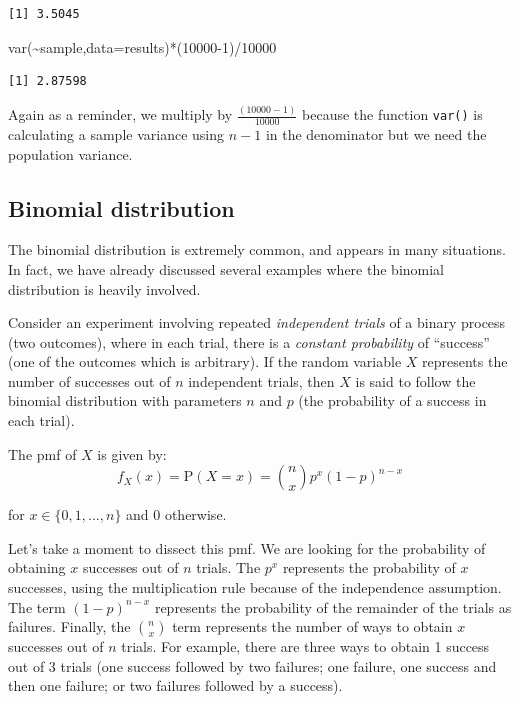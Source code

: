 \documentclass[
  letterpaper,
  DIV=11,
  numbers=noendperiod]{scrreprt}
\newenvironment{Shaded}{\begin{snugshade}}{\end{snugshade}}
\newcommand{\AttributeTok}[1]{\textcolor[rgb]{0.40,0.45,0.13}{#1}}
\newcommand{\DecValTok}[1]{\textcolor[rgb]{0.68,0.00,0.00}{#1}}
\newcommand{\FunctionTok}[1]{\textcolor[rgb]{0.28,0.35,0.67}{#1}}
\newcommand{\NormalTok}[1]{\textcolor[rgb]{0.00,0.23,0.31}{#1}}
\newcommand{\SpecialCharTok}[1]{\textcolor[rgb]{0.37,0.37,0.37}{#1}}
\begin{document}
\begin{verbatim}
[1] 3.5045
\end{verbatim}

\begin{Shaded}
\begin{Highlighting}[]
\FunctionTok{var}\NormalTok{(}\SpecialCharTok{\textasciitilde{}}\NormalTok{sample,}\AttributeTok{data=}\NormalTok{results)}\SpecialCharTok{*}\NormalTok{(}\DecValTok{10000{-}1}\NormalTok{)}\SpecialCharTok{/}\DecValTok{10000}
\end{Highlighting}
\end{Shaded}

\begin{verbatim}
[1] 2.87598
\end{verbatim}

Again as a reminder, we multiply by \(\frac{(10000-1)}{10000}\) because
the function \texttt{var()} is calculating a sample variance using
\(n-1\) in the denominator but we need the population variance.

\subsection{Binomial distribution}\label{binomial-distribution}

The binomial distribution is extremely common, and appears in many
situations. In fact, we have already discussed several examples where
the binomial distribution is heavily involved.

Consider an experiment involving repeated \emph{independent trials} of a
binary process (two outcomes), where in each trial, there is a
\emph{constant probability} of ``success'' (one of the outcomes which is
arbitrary). If the random variable \(X\) represents the number of
successes out of \(n\) independent trials, then \(X\) is said to follow
the binomial distribution with parameters \(n\) and \(p\) (the
probability of a success in each trial).

The pmf of \(X\) is given by: \[
f_X(x)=\mbox{P}(X=x)={n\choose{x}}p^x(1-p)^{n-x}
\]

for \(x \in \{0,1,...,n\}\) and 0 otherwise.

Let's take a moment to dissect this pmf. We are looking for the
probability of obtaining \(x\) successes out of \(n\) trials. The
\(p^x\) represents the probability of \(x\) successes, using the
multiplication rule because of the independence assumption. The term
\((1-p)^{n-x}\) represents the probability of the remainder of the
trials as failures. Finally, the \(n\choose x\) term represents the
number of ways to obtain \(x\) successes out of \(n\) trials. For
example, there are three ways to obtain 1 success out of 3 trials (one
success followed by two failures; one failure, one success and then one
failure; or two failures followed by a success).
\end{document}
